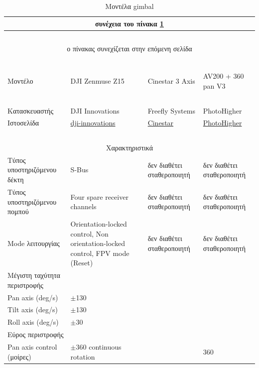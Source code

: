 \documentclass[a4paper, 12pt, twoside]{report}
\begin{document}
{{{{{{\begin{landscape}
			\begin{longtable} { m{3cm} m{3.5cm} m{3.5cm} m{3.5cm}}
					\caption [Μοντέλα gimbal]{Μοντέλα gimbal}
					\label{πιν.:Μοντέλα gimbal}\\
					\hline
					\endfirsthead
					\multicolumn{4}{c}{συνέχεια του πίνακα \ref{πιν.:Μοντέλα gimbal}}\\
					\hline
					~\\
					\endhead
					\hline
					\multicolumn{4}{c}{ο πίνακας συνεχίζεται στην επόμενη σελίδα}\\
					\endfoot
					\multicolumn{4}{c}{ολοκληρώθηκε ο πίνακας \ref{πιν.:Μοντέλα gimbal}}\\
					\endlastfoot
					~\\
					Μοντέλο & DJI Zenmuse Z15 & Cinestar 3 Axis & AV200 + 360 pan V3\\
					\hline
					~\\
					Κατασκευαστής & DJI Innovations & Freefly Systems & PhotoHigher\\
					Ιστοσελίδα & \href{http://www.dji-innovations.com/products/zenmuse-z15/overview/}{dji-innovations} & \href{http://www.freeflysystems.com/products/cinestar-3-axis-gimbal.php}{Cinestar} & \href{http://photohigher.co.nz/products/camera-gimbals-and-kits/av200-pan-360-with-skids/}{PhotoHigher}\\
					\hline
					~\\
					\multicolumn{4}{c}{Χαρακτηριστικά}\\
					\hdashline
					Τύπος υποστηριζόμενου δέκτη & S-Bus  & δεν διαθέτει σταθεροποιητή & δεν διαθέτει σταθεροποιητή\\
					\hdashline
					Τύπος υποστηριζόμενου πομπού & Four spare receiver channels & δεν διαθέτει σταθεροποιητή & δεν διαθέτει σταθεροποιητή\\
					\hdashline
					Mode λειτουργίας & Orientation-locked control, Non orientation-locked control, FPV mode (Reset) & δεν διαθέτει σταθεροποιητή & δεν διαθέτει σταθεροποιητή\\
					\hdashline
					Μέγιστη ταχύτητα περιστροφής & & & \\
					Pan axis (deg/s) & $\pm$130 & & \\
					Tilt axis  (deg/s) & $\pm$130 & & \\
					Roll axis (deg/s) & $\pm$30 & & \\
					\hdashline
					Εύρος περιστροφής & & & \\
					Pan axis control (μοίρες) & $\pm$360 continuous rotation & & 360\\

\end{longtable}
\end{landscape}}}}}}}
\end{document}
